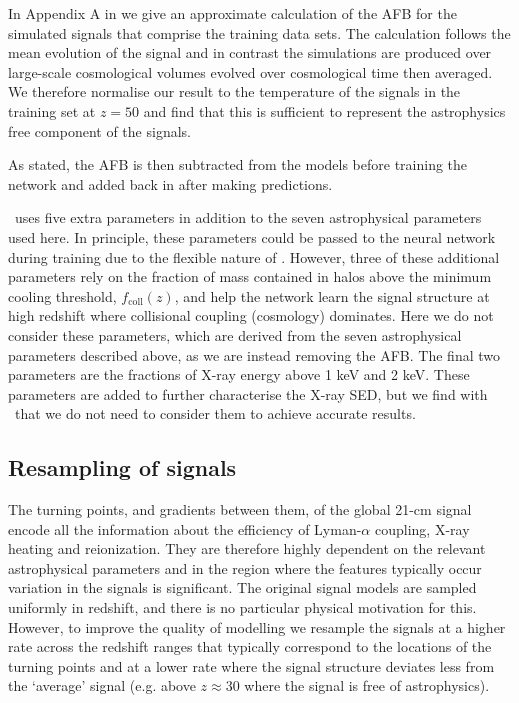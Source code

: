 In Appendix A in \cite{Bevins_globalemu_2021} we give an approximate calculation of the AFB for the simulated signals that comprise the training data sets. The calculation follows the mean evolution of the signal and in contrast the simulations are produced over large-scale cosmological volumes evolved over cosmological time then averaged. We therefore normalise our result to the temperature of the signals in the training set at $z = 50$ and find that this is sufficient to represent the astrophysics free component of the signals.

As stated, the AFB is then subtracted from the models before training the network and added back in after making predictions.

\cmGEM~uses five extra parameters in addition to the seven astrophysical parameters used here. In principle, these parameters could be passed to the neural network during training due to the flexible nature of \name. However, three of these additional parameters rely on the fraction of mass contained in halos above the minimum cooling threshold, $f_\mathrm{coll}(z)$, and help the network learn the signal structure at high redshift where collisional coupling (cosmology) dominates. Here we do not consider these parameters, which are derived from the seven astrophysical parameters described above, as we are instead removing the AFB. The final two parameters are the fractions of X-ray energy above 1 keV and 2 keV. These parameters are added to further characterise the X-ray SED, but we find with \name~that we do not need to consider them to achieve accurate results.

\subsection{Resampling of signals}

The turning points, and gradients between them, of the global 21-cm signal encode all the information about the efficiency of Lyman-$\alpha$ coupling, X-ray heating and reionization. They are therefore highly dependent on the relevant astrophysical parameters and in the region where the features typically occur variation in the signals is significant. The original signal models are sampled uniformly in redshift, and there is no particular physical motivation for this. However, to improve the quality of modelling we resample the signals at a higher rate across the redshift ranges that typically correspond to the locations of the turning points and at a lower rate where the signal structure deviates less from the `average' signal (e.g. above $z\approx30$ where the signal is free of astrophysics).

